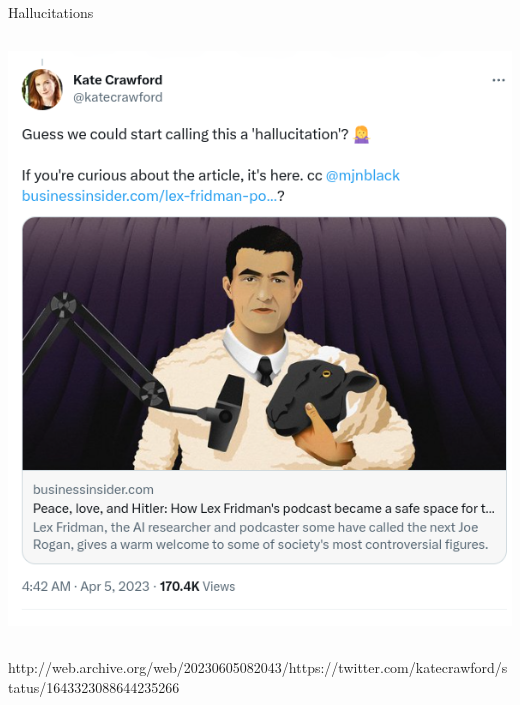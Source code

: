 \documentclass[aspectratio=169]{beamer}
\begin{document}
\begin{frame}{Hallucitations}
\begin{columns}[t]
\begin{column}{.4\textwidth}
        \includegraphics[width=\textwidth]{Figures/Screenshot from 2023-06-05 18-19-43.png}
\end{column}
\end{columns}
 
   http://web.archive.org/web/20230605082043/https://twitter.com/katecrawford/status/1643323088644235266
   
\end{frame}
\end{document}
